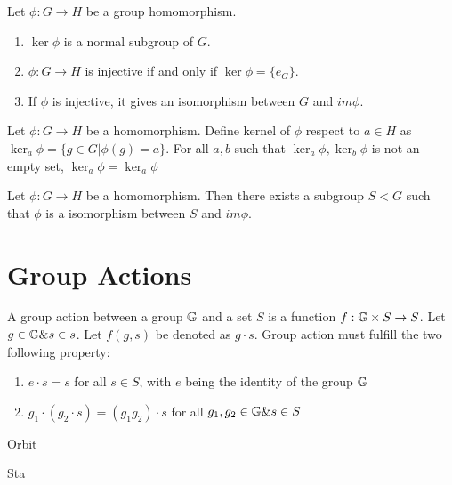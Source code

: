 \documentclass[../note.tex]{subfiles}
\begin{document}
\begin{theorem}
	Let $\phi : G \rightarrow H$ be a group homomorphism.
\begin{enumerate}
	\item $\ker{\phi}$ is a normal subgroup of $G$. 
	\item $\phi: G \rightarrow H$ is injective if and only if $\ker{\phi} = \{e_{G}\}$.
	\item If $\phi$ is injective, it gives an isomorphism between $G$ and $im{\phi}$.
\end{enumerate}
\end{theorem}

\begin{hypothesis}
	Let $\phi: G \rightarrow H$ be a homomorphism.
	Define kernel of $\phi$ respect to $a \in H$ as $\ker_a{\phi}=\{g\in G| \phi(g)=a\}$.
	For all $a, b$ such that $\ker_a{\phi}, \ker_b{\phi}$ is not an empty set, $\ker_a{\phi}=\ker_a{\phi}$ 
\end{hypothesis}

\begin{hypothesis}
	Let $\phi: G \rightarrow H$ be a homomorphism. Then there exists a subgroup $S < G$ such that $\phi$ is a isomorphism between $S$ and $im \phi$.
\end{hypothesis}

\section{Group Actions}
\begin{definition}
	A group action between a group $\mathbb{G}$ and a set $S$ is a function $f: \mathbb{G}\times S \rightarrow S$. 
	Let $g\in \mathbb{G} \& s \in s$. Let $f(g,s)$ be denoted as $g\cdot s$. Group action must fulfill the two following property:
	\begin{enumerate}
		\item $e\cdot s=s$ for all $s\in S$, with $e$ being the identity of the group $\mathbb{G}$
		\item $g_1\cdot(g_2 \cdot s) = (g_1 g_2) \cdot s$ for all $g_1, g_2 \in \mathbb{G} \& s \in S$
	\end{enumerate}
\end{definition}
\begin{definition}[Orbit]
	Orbit
\end{definition}

\begin{definition}[Stabilizer]
	Sta
\end{definition}
\end{document}
